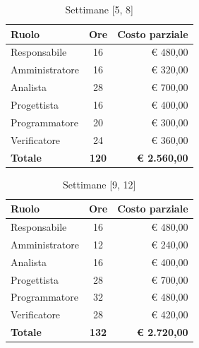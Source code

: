 \documentclass[11pt, a4paper]{article}
\begin{document}
\begin{table}[htbp]
    \centering
    \caption{Settimane [5, 8]}
    \vspace{0.2cm}
    \renewcommand{\arraystretch}{1.5}
    \begin{tabularx}{\textwidth}{|X|c|r|}
        \hline
        \rowcolor{gray!10} \textbf{Ruolo} & \textbf{Ore} & \textbf{Costo parziale} \\ \hline
        Responsabile & 16 & € 480,00 \\ \hline
        Amministratore & 16 & € 320,00 \\ \hline
        Analista & 28 & € 700,00 \\ \hline
        Progettista & 16 & € 400,00 \\ \hline
        Programmatore & 20 & € 300,00 \\ \hline
        Verificatore & 24 & € 360,00 \\ \hline
        \rowcolor{gray!20} \textbf{Totale} & \textbf{120} & \textbf{€ 2.560,00} \\ \hline
    \end{tabularx}
\end{table}

\begin{table}[htbp]
    \centering
    \caption{Settimane [9, 12]}
    \vspace{0.2cm}
    \renewcommand{\arraystretch}{1.5}
    \begin{tabularx}{\textwidth}{|X|c|r|}
        \hline
        \rowcolor{gray!10} \textbf{Ruolo} & \textbf{Ore} & \textbf{Costo parziale} \\ \hline
        Responsabile & 16 & € 480,00 \\ \hline
        Amministratore & 12 & € 240,00 \\ \hline
        Analista & 16 & € 400,00 \\ \hline
        Progettista & 28 & € 700,00 \\ \hline
        Programmatore & 32 & € 480,00 \\ \hline
        Verificatore & 28 & € 420,00 \\ \hline
        \rowcolor{gray!20} \textbf{Totale} & \textbf{132} & \textbf{€ 2.720,00} \\ \hline
    \end{tabularx}
\end{table}
\end{document}
